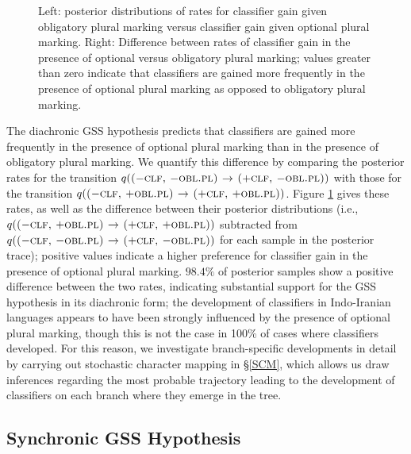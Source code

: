 \documentclass[11pt]{article}
\begin{document}
\begin{figure}[h!]
\begin{minipage}[t]{.45\linewidth}
\end{minipage}
\caption{Left: posterior distributions of rates for classifier gain given obligatory plural marking versus classifier gain given optional plural marking. Right: Difference between rates of classifier gain in the presence of optional versus obligatory plural marking; values greater than zero indicate that classifiers are gained more frequently in the presence of optional plural marking as opposed to obligatory plural marking.}
\label{dia_rates}
\end{figure}

The diachronic GSS hypothesis predicts that classifiers are gained more frequently in the presence of optional plural marking than in the presence of obligatory plural marking. We quantify this difference by comparing the posterior rates for the transition $q(\text{\sc ($-$clf, $-$obl.pl) $\rightarrow$ ($+$clf, $-$obl.pl)})$ with those for the transition $q(\text{\sc ($-$clf, $+$obl.pl) $\rightarrow$ ($+$clf, $+$obl.pl)})$. Figure \ref{dia_rates} gives these rates, as well as the difference between their posterior distributions (i.e., $q(\text{\sc ($-$clf, $+$obl.pl) $\rightarrow$ ($+$clf, $+$obl.pl)})$ subtracted from $q(\text{\sc ($-$clf, $-$obl.pl) $\rightarrow$ ($+$clf, $-$obl.pl)})$ for each sample in the posterior trace); positive values indicate a higher preference for classifier gain in the presence of optional plural marking. $98.4\%$ of posterior samples show a positive difference between the two rates, indicating substantial support for the GSS hypothesis in its diachronic form; the development of classifiers in Indo-Iranian languages appears to have been strongly influenced by the presence of optional plural marking, though this is not the case in 100\% of cases where classifiers developed. For this reason, we investigate branch-specific developments in detail by carrying out stochastic character mapping in \S\ref{SCM}, which allows us draw inferences regarding the most probable trajectory leading to the development of classifiers on each branch where they emerge in the tree. 

\subsection{Synchronic GSS Hypothesis}
\end{document}
